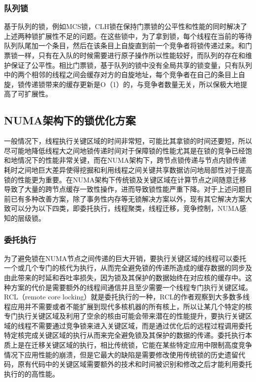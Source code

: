 \subsubsection{队列锁}
基于队列的锁，例如MCS锁\cite{mellor1991algorithms}\cite{scott2013shared}，CLH锁\cite{craig1993building}\cite{magnusson1994queue}\cite{scott2013shared}在保持门票锁的公平性和性能的同时解决了上述两种锁扩展性不足的问题。在这些锁中，为了拿到锁，每个线程在当前的等待队列队尾加一个条目，然后在该条目上自旋直到前一个竞争者将锁传递过来。和门票锁一样，只有在入队的时候需要进行原子操作所以性能较好，而队列的存在和维护保证了公平性。相比门票锁，基于队列的锁中没有全局共享的锁变量，只有队列中的两个相邻的线程之间会缓存对方的自旋地址，每个竞争者在自己的条目上自旋，锁传递锁带来的缓存更新是O（1）的，与竞争者数量无关，所以保极大地提高了可扩展性。

\subsection{NUMA架构下的锁优化方案}
一般情况下，线程执行关键区域的时间非常短，可能比其拿锁的时间还要短\cite{johnson2010decoupling}，所以尽可能地降低线程大之间地锁传递时间对于保障锁的性能尤其是在锁的竞争已经饱和地情况下的性能非常关键，而在NUMA架构下，跨节点锁传递与节点内锁传递耗时之间地巨大差异使得挖掘和利用线程之间关键共享数据访问地局部性对于提高锁的性能更为重要。在NUMA架构下传统锁及关键区域在计算节点之间随意迁移导致了大量的跨节点缓存一致性操作，进而导致锁性能严重下降。对于上述问题目前已有多种改善方案，除了事务性内存等无锁解决方案以外，现有其它解决方案大致可以分为以下四类，即委托执行，线程聚类，线程迁移，竞争控制，NUMA感知的层级锁。
\subsubsection{委托执行}
为了避免锁在NUMA节点之间传递的巨大开销，要执行关键区域的线程可以委托一个或几个专门的核代为执行\cite{oyama1999executing}\cite{lozi2012remote}\cite{fatourou2012revisiting}\cite{hendler2010flat}\cite{guiroux2016multicore}，从而完全避免锁的传递所造成的缓存数据的同步及由此带来的时延和吞吐率损失，因为锁及其保护的数据始终在对应核的缓存中。这种方案的代价是需要额外的线程间通信并且至少需要一个线程专门执行关键区域。RCL（remote core locking）\cite{lozi2012remote}就是委托执行的一种，RCL的作者观察到大多数多线程应用并不需要或者不能扩展到现代多核机器的所有核上，所以让某几个特定的核专门执行关键区域及利用了空余的核由可能会带来潜在的性能提升，要执行关键区域的线程不需要通过竞争锁来进入关键区域，而是通过优化后的远程过程调用委托特定核完成关键区域的执行从而来完全避免锁及其保护的数据的传递。委托执行本质上是在迁移关键区域的执行，相比传统锁，它能在某些特定应用中限制高度竞争情况下应用性能的崩溃，但是它最大的缺陷是需要修改使用传统锁的历史遗留代码，原有代码中的关键区域需要额外的技术和时间被识别和修改之后才能利用委托执行的的高性能。
